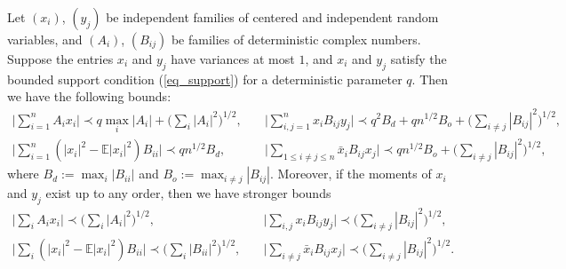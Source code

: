 \begin{lemma}\label{largedeviation}
Let $(x_i)$, $(y_j)$ be independent families of centered and independent random variables, and $(A_i)$, $(B_{ij})$ be families of deterministic complex numbers. Suppose the entries $x_i$ and $y_j$ have variances at most $1$, and $ x_i$ and $ y_j$ satisfy the bounded support condition (\ref{eq_support}) for a deterministic parameter $q$. %
Then we have the following bounds:
\begin{align}
\Big| \sum_{i=1}^n A_i x_i \Big\vert \prec  q \max_{i} \vert A_i \vert+ \Big(\sum_i |A_i|^2 \Big)^{1/2} , \quad &\Big\vert  \sum_{i,j=1}^n x_i B_{ij} y_j \Big\vert \prec q^2 B_d  + q n^{1/2}B_o +  \Big(\sum_{i\ne j} |B_{ij}|^2\Big)^{{1}/{2}},\label{eq largedev10}  \\
\Big\vert  \sum_{i=1}^n (|x_i|^2-\mathbb E|x_i|^2) B_{ii}  \Big\vert  \prec q n^{1/2}B_d   , \quad &\Big\vert  \sum_{1\le i\ne j\le n} \bar x_i B_{ij} x_j \Big\vert  \prec qn^{1/2}B_o +  \Big(\sum_{i\ne j} |B_{ij}|^2\Big)^{{1}/{2}} ,\label{eq largedev20} 
\end{align}
where $B_d:=\max_{i} |B_{ii} |$ and $B_o:= \max_{i\ne j} |B_{ij}|.$ Moreover, if the moments of $ x_i$ and $ y_j$ exist up to any order, then we have stronger bounds
\begin{align}
\Big\vert \sum_i A_i x_i \Big\vert \prec  \Big(\sum_i |A_i|^2 \Big)^{1/2} , \quad  & \Big\vert \sum_{i,j} x_i B_{ij} y_j \Big\vert \prec  \Big(\sum_{i\ne j} |B_{ij}|^2\Big)^{{1}/{2}} ,\label{eq largedev1} \\
 \Big\vert  \sum_{i} (|x_i|^2-\mathbb E|x_i|^2) B_{ii}  \Big\vert  \prec  \Big( \sum_i |B_{ii} |^2\Big)^{1/2}  ,\quad & \Big\vert  \sum_{i\ne j} \bar x_i B_{ij} x_j \Big\vert  \prec \Big(\sum_{i\ne j} |B_{ij}|^2\Big)^{{1}/{2}} .\label{eq largedev2}
\end{align}
\end{lemma}


